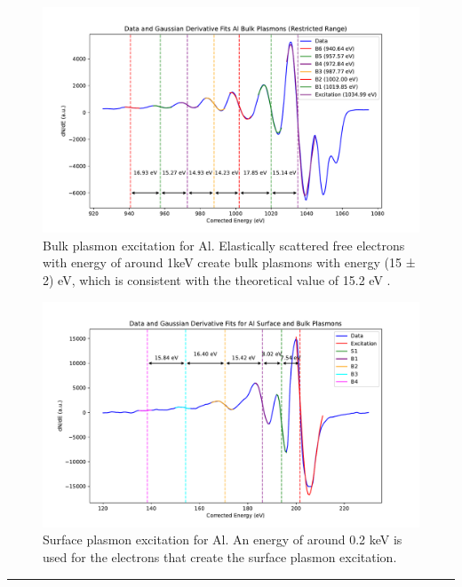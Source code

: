 \documentclass[12pt]{article}
\begin{document}
\begin{figure}[H]
  \includegraphics[scale = 0.49]{bulk.pdf}
  \caption{Bulk plasmon excitation for Al. Elastically scattered free electrons with energy of around 1keV create bulk plasmons with energy (15 ± 2) eV, which is consistent with the theoretical value of 15.2 eV \cite{dufor}. }
  \label{bulkplasmonss}
\end{figure}

\begin{figure}[H]
  \includegraphics[scale = 0.49]{surfaceplasmons_30uV_156deg_300ms_1.9e-09mbar_200eV_Al_KLL_peaks_fit_with_baseline_plot_shifted.pdf}
  \caption{Surface plasmon excitation for Al. An energy of around 0.2 keV is used for the electrons that create the surface plasmon excitation. }
  \label{surfaceplasmonss}
\end{figure}



\rule{\textwidth}{0.5pt}
\end{document}
